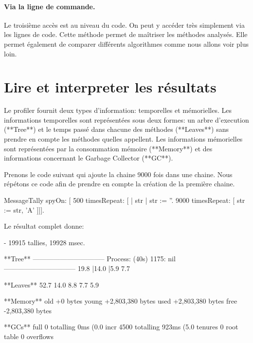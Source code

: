 \documentclass[a4paper,10pt,twoside]{book}
\begin{document}
\paragraph{Via la ligne de commande.}
Le troisi\`eme acc\`es est au niveau du code. On peut y acc\'eder tr\`es simplement via les lignes de code. Cette m\'ethode permet de ma\^itriser les m\'ethodes analys\'es. Elle permet \'egalement de comparer diff\'erents algorithmes comme nous allons voir plus loin.


\section{Lire et interpreter les r\'esultats} 
Le profiler fournit deux types d'information: temporelles et m\'emorielles. Les informations temporelles sont repr\'esent\'ees sous deux formes: un arbre d'execution (**Tree**) et le temps pass\'e dans chacune des m\'ethodes (**Leaves**) sans prendre en compte les m\'ethodes quelles appellent. Les informations m\'emorielles sont repr\'esent\'ees par la consommation m\'emoire (**Memory**) et des informations concernant le Garbage Collector (**GC**).


Prenons le code suivant qui ajoute la chaine  9000 fois dans
une chaine. Nous r\'ep\'etons ce code afin de prendre en compte la
cr\'eation de la premi\`ere chaine. 

\begin{code}{}
MessageTally spyOn: 
     [ 500 timesRepeat: [
                     | str |  
                     str := ''. 
                     9000 timesRepeat: [ str := str, 'A' ]]].
\end{code} 


Le r\'esultat complet donne:
\begin{footnotesize}
\begin{sf}
 - 19915 tallies, 19928 msec.

**Tree**
--------------------------------
Process: (40s)  1175: nil
--------------------------------
19.8%
  |14.0%
  |5.9%
7.7%

**Leaves**
52.7%
14.0%
8.8%
7.7%
5.9%

**Memory**
	old			+0 bytes
	young		+2,803,380 bytes
	used		+2,803,380 bytes
	free		-2,803,380 bytes

**GCs**
	full			0 totalling 0ms (0.0%
	incr		4500 totalling 923ms (5.0%
	tenures		0
	root table	0 overflows
\end{sf}
\end{footnotesize}
\end{document}
